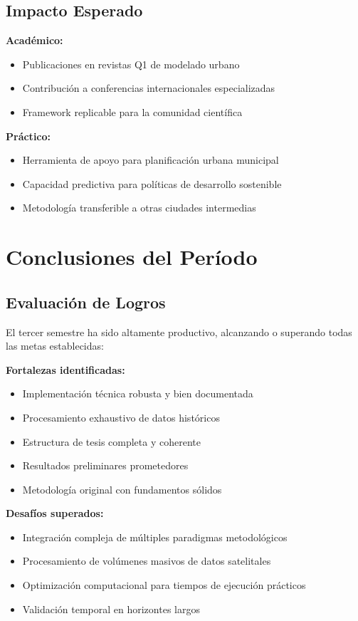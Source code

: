 \documentclass[12pt,letterpaper]{article}
\begin{document}
\subsection{Impacto Esperado}

\textbf{Académico:}
\begin{itemize}
\item Publicaciones en revistas Q1 de modelado urbano
\item Contribución a conferencias internacionales especializadas
\item Framework replicable para la comunidad científica
\end{itemize}

\textbf{Práctico:}
\begin{itemize}
\item Herramienta de apoyo para planificación urbana municipal
\item Capacidad predictiva para políticas de desarrollo sostenible
\item Metodología transferible a otras ciudades intermedias
\end{itemize}

\section{Conclusiones del Período}

\subsection{Evaluación de Logros}

El tercer semestre ha sido altamente productivo, alcanzando o superando todas las metas establecidas:

\textbf{Fortalezas identificadas:}
\begin{itemize}
\item Implementación técnica robusta y bien documentada
\item Procesamiento exhaustivo de datos históricos
\item Estructura de tesis completa y coherente
\item Resultados preliminares prometedores
\item Metodología original con fundamentos sólidos
\end{itemize}

\textbf{Desafíos superados:}
\begin{itemize}
\item Integración compleja de múltiples paradigmas metodológicos
\item Procesamiento de volúmenes masivos de datos satelitales
\item Optimización computacional para tiempos de ejecución prácticos
\item Validación temporal en horizontes largos
\end{itemize}
\end{document}
